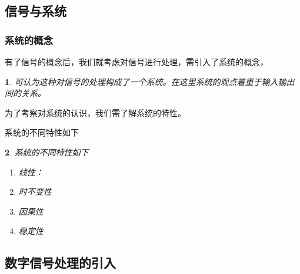 \documentclass[notheorems,compress,mathserif,table]{beamer}
\newtheorem{dablock}{}
\begin{document}
\subsection{信号与系统}
\begin{frame}[shrink]\frametitle{系统的概念}%


    有了信号的概念后，我们就考虑对信号进行处理，需引入了系统的概念，

\begin{dablock}
    可认为这种对信号的处理构成了一个系统。在这里系统的观点着重于输入输出间的关系。
\end{dablock}
    为了考察对系统的认识，我们需了解系统的特性。

    系统的不同特性如下
    \begin{dablock}
    系统的不同特性如下
    \begin{enumerate}
      \item 线性：   %
      \item 时不变性  %
      \item 因果性  %
      \item 稳定性  %
    \end{enumerate}
    \end{dablock}
\end{frame}
%
%
%
%
%
%
\subsection{数字信号处理的引入}
\end{document}
